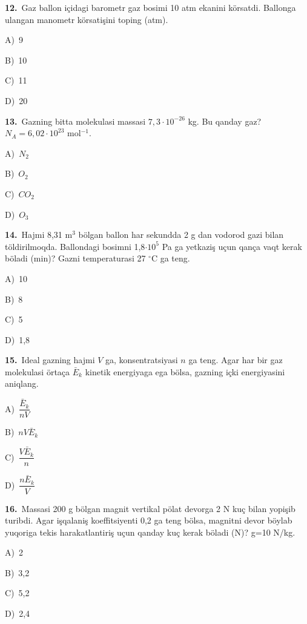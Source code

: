 \documentclass[11pt,a4paper]{article}
\newcommand{\opt}[2]{\hspace*{4mm}#1)\ #2\par}
\begin{document}
\noindent\begin{minipage}{\linewidth}
\textbf{12.}\ Gaz ballon içidagi barometr gaz bosimi 10 atm ekanini körsatdi. Ballonga ulangan manometr körsatişini toping (atm).\par\smallskip
\opt{A}{9}
\opt{B}{10}
\opt{C}{11}
\opt{D}{20}
\end{minipage}\vspace{9pt}\par
\noindent\begin{minipage}{\linewidth}
\textbf{13.}\ Gazning bitta molekulasi massasi $7{,}3\cdot10^{-26}$ kg. Bu qanday gaz? $N_A=6{,}02\cdot10^{23}$ mol$^{-1}$.\par\smallskip
\opt{A}{$N_2$}
\opt{B}{$O_2$}
\opt{C}{$CO_2$}
\opt{D}{$O_3$}
\end{minipage}\vspace{9pt}\par
\noindent\begin{minipage}{\linewidth}
\textbf{14.}\ Hajmi 8,31 m$^{3}$ bölgan ballon har sekundda 2 g dan vodorod gazi bilan töldirilmoqda. Ballondagi bosimni 1,8$\cdot10^{5}$ Pa ga yetkaziş uçun qança vaqt kerak böladi (min)? Gazni temperaturasi 27 $^\circ$C ga teng.\par\smallskip
\opt{A}{10}
\opt{B}{8}
\opt{C}{5}
\opt{D}{1,8}
\end{minipage}\vspace{9pt}\par
\noindent\begin{minipage}{\linewidth}
\textbf{15.}\ Ideal gazning hajmi $V$ ga, konsentratsiyasi $n$ ga teng. Agar har bir gaz molekulasi örtaça $\bar{E}_k$ kinetik energiyaga ega bölsa, gazning içki energiyasini aniqlang.\par\smallskip
\opt{A}{$\dfrac{\bar{E}_k}{nV}$}
\opt{B}{$nV\bar{E}_k$}
\opt{C}{$\dfrac{V\bar{E}_k}{n}$}
\opt{D}{$\dfrac{n\bar{E}_k}{V}$}
\end{minipage}\vspace{9pt}\par
\noindent\begin{minipage}{\linewidth}
\textbf{16.}\ Massasi 200 g bölgan magnit vertikal pölat devorga 2 N kuç bilan yopişib turibdi. Agar işqalaniş koeffitsiyenti 0,2 ga teng bölsa, magnitni devor böylab yuqoriga tekis harakatlantiriş uçun qanday kuç kerak böladi (N)? g=10 N/kg.\par\smallskip
\opt{A}{2}
\opt{B}{3,2}
\opt{C}{5,2}
\opt{D}{2,4}
\end{minipage}\vspace{9pt}\par
\end{document}
